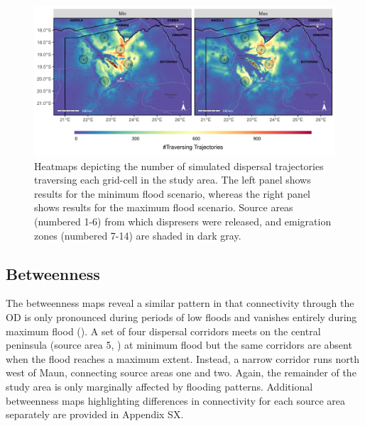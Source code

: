 \documentclass[abstract=on,10pt,a4paper,bibliography=totocnumbered]{article}
\begin{document}
\begin{figure}
  \begin{center}
  \includegraphics[width = \textwidth]{99_Heatmaps.png}
  \caption{Heatmaps depicting the number of simulated dispersal trajectories
  traversing each grid-cell in the study area. The left panel shows results for
  the minimum flood scenario, whereas the right panel shows results for the
  maximum flood scenario. Source areas (numbered 1-6) from which dispresers were
  released, and emigration zones (numbered 7-14) are shaded in dark gray.}
  \label{Heatmaps}
  \end{center}
\end{figure}

\subsection{Betweenness}
The betweenness maps reveal a similar pattern in that connectivity through the
OD is only pronounced during periods of low floods and vanishes entirely during
maximum flood (). A set of four dispersal corridors meets on
the central peninsula (source area 5, ) at minimum flood but
the same corridors are absent when the flood reaches a maximum extent. Instead,
a narrow corridor runs north west of Maun, connecting source areas one and two.
Again, the remainder of the study area is only marginally affected by flooding
patterns. Additional betweenness maps highlighting differences in connectivity
for each source area separately are provided in Appendix SX.
\end{document}
